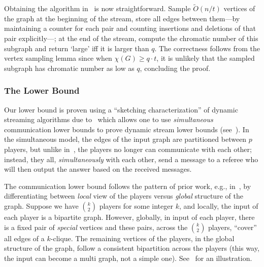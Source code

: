 \documentclass[11pt]{article}
\theoremstyle{definition}
\renewcommand{\geq}{\geqslant}
\newcommand{\Ot}{\ensuremath{\widetilde{O}}}
\begin{document}
Obtaining the algorithm in~ is now straightforward. Sample $\Ot(n/t)$ vertices of the graph at the beginning of the stream, store all edges between them---by maintaining a counter for each pair and counting
insertions and deletions of that pair explicitly---; at the end of the stream, compute the chromatic number of this subgraph and return `large' iff it is larger than $q$. The correctness follows from the vertex sampling lemma since when $\chi(G) \geq q \cdot t$, 
it is unlikely that the sampled subgraph has chromatic number as low as $q$, concluding the proof. 

\subsubsection{The Lower Bound}

Our lower bound is proven using a ``sketching characterization'' of dynamic streaming algorithms due to~\cite{LiNW14,AiHLW16} which allows one to use \emph{simultaneous} communication lower bounds 
to prove dynamic stream lower bounds (see~). In the simultaneous model, the edges of the input graph are partitioned between $p$ players, but unlike in~, the players no longer can communicate with each other; 
instead, they all, \emph{simultaneously} with each other, send a message to a referee who will then output the answer based on the received messages. 

The communication lower bound follows the pattern of prior work, e.g., in~\cite{Konrad15,AssadiKLY16,AssadiKL17}, by differentiating between \emph{local} view of the players versus \emph{global} structure of the graph. 
Suppose we have $\binom{k}{2}$ players for some integer $k$, and locally, the input of each player is a bipartite graph. However, globally, in input of each player, there is a fixed pair of \emph{special} vertices and these pairs, 
across the $\binom{k}{2}$ players, ``cover'' all edges of a $k$-clique. The remaining vertices of the players, in the global structure of the graph, follow a consistent bipartition across the players (this way, the input can become 
a multi graph, not a simple one). See~ for an illustration. 

\medskip
\end{document}

